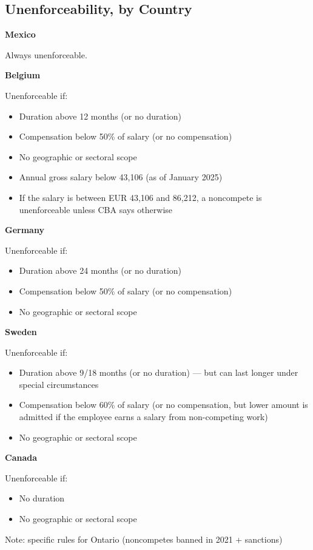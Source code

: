 \documentclass[11pt,a4paper]{article}
\begin{document}
\newpage
\subsection{Unenforceability, by Country}

	\textbf{Mexico}

Always unenforceable.

	\textbf{Belgium}

Unenforceable if:
\begin{itemize}
	\item Duration above 12 months (or no duration)
	\item Compensation below 50\% of salary (or no compensation)
	\item No geographic or sectoral scope
	\item Annual gross salary below 43,106 (as of January 2025)
	\item If the salary is between EUR 43,106 and 86,212, a noncompete is unenforceable unless CBA says otherwise
\end{itemize}

	\textbf{Germany}

Unenforceable if:
\begin{itemize}
	\item Duration above 24 months (or no duration)
	\item Compensation below 50\% of salary (or no compensation)
	\item No geographic or sectoral scope
\end{itemize}

	\textbf{Sweden}

Unenforceable if:
\begin{itemize}
	\item Duration above 9/18 months (or no duration) --- but can last longer under special circumstances
	\item Compensation below 60\% of salary (or no compensation, but lower amount is admitted if the employee earns a salary from non-competing work)
	\item No geographic or sectoral scope
\end{itemize}

	\textbf{Canada}

Unenforceable if:
\begin{itemize}
	\item No duration
	\item No geographic or sectoral scope
\end{itemize}
Note: specific rules for Ontario (noncompetes banned in 2021 + sanctions)
\end{document}

